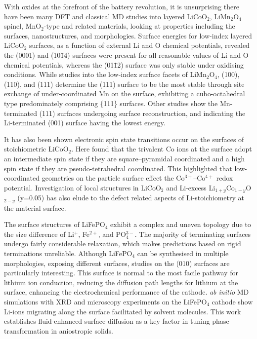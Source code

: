 \documentclass[../main.tex]{subfiles}
\begin{document}
With oxides at the forefront of the battery revolution, it is unsurprising there have been many DFT and classical MD studies into layered LiCoO$_2$, LiMn$_2$O$_4$ spinel, MnO$_2$-type and related materials, looking at properties including the surfaces, nanostructures, and morphologies.\cite{kramer2009tailoring,xu2011identifying, daheron2009surface,kim2012first,benedek2011simulation,karim2013surface,leung2012first, tompsett2013nanostructuring} Surface energies for low-index layered LiCoO$_2$ surfaces, as a function of external Li and O chemical potentials, revealed the (0001) and (10\={1}4) surfaces were present for all reasonable values of Li and O chemical potentials, whereas the (01\={1}2) surface was only stable under oxidising conditions. \cite{kramer2009tailoring} While studies into the low-index surface facets of LiMn$_2$O$_4$, (100),(110), and (111) determine the (111) surface to be the most stable through site exchange of under-coordinated Mn on the surface, exhibiting a cubo-octahedral type predominately comprising \{111\} surfaces. \cite{karim2013surface} Other studies show the Mn-terminated (111) surfaces undergoing surface reconstruction, and indicating the Li-terminated (001) surface having the lowest energy. \cite{benedek2011simulation}

It has also been shown electronic spin state transitions occur on the surfaces of stoichiometric LiCoO$_2$. Here \citeauthor{qian2012electronic} found that the trivalent Co ions at the surface adopt an intermediate spin state if they are square–pyramidal coordinated and a high spin state if they are pseudo-tetrahedral coordinated. This highlighted that low-coordinated geometries on the particle surface effect the Co$^{3+}$–Co$^{4+}$ redox potential. \cite{qian2012electronic} Investigation of local structures in LiCoO$_2$ and Li-excess Li$_{1+y}$Co$_{1-y}$O$_{2-y}$ (y=0.05) has also elude to the defect related aspects of Li-stoichiometry at the material surface. \cite{daheron2009surface} 

The surface structures of LiFePO$_4$ exhibit a complex and uneven topology due to the size difference of Li$^+$, Fe$^{2+}$, and PO$_{4}^{3-}$. The majority of terminating surfaces undergo fairly considerable relaxation, which makes predictions based on rigid terminations unreliable.  Although LiFePO$_4$ can be synthesised in multiple morphologies, \cite{chen2006electron,ellis2007synthesis} exposing different surfaces, studies on the (010) surfaces are particularly interesting. This surface is normal to the most facile pathway for lithium ion conduction, \cite{islam2010recent} reducing the diffusion path lengths for lithium at the surface, enhancing the electrochemical performance of the cathode. \textit{ab initio} MD simulations with XRD and microscopy experiments on the LiFePO$_4$ cathode show Li-ions migrating along the surface facilitated by solvent molecules. \cite{li2018fluid} This work establishes fluid-enhanced surface diffusion as a key factor in tuning phase transformation in aniostropic solids.
\end{document}
